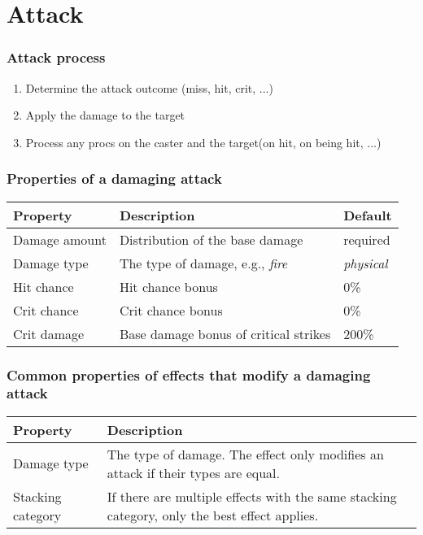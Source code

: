 \chapter{Attack}

\subsection*{Attack process}

\begin{enumerate}
	\item  Determine the attack outcome (miss, hit, crit, ...)
	\item  Apply the damage to the target
	\item  Process any procs on the caster and the target(on hit, on being hit, ...)
\end{enumerate}

\subsection*{Properties of a damaging attack}

\begin{tabular}{p{4cm} l l}
\toprule
Property & Description & Default \\
\midrule
Damage amount & Distribution of the base damage & required \\
Damage type & The type of damage, e.g., \emph{fire} & \emph{physical} \\
Hit chance & Hit chance bonus & 0\% \\
Crit chance & Crit chance bonus & 0\% \\
Crit damage & Base damage bonus of critical strikes & 200\% \\
\bottomrule
\end{tabular}

\subsection*{Common properties of effects that modify a damaging attack}

\begin{tabular}{p{4cm} p{10cm}}
\toprule
Property & Description \\
\midrule
Damage type & The type of damage. The effect only modifies an attack if their types are equal. \\
Stacking category & If there are multiple effects with the same stacking category, only the best effect applies. \\
\bottomrule
\end{tabular}

